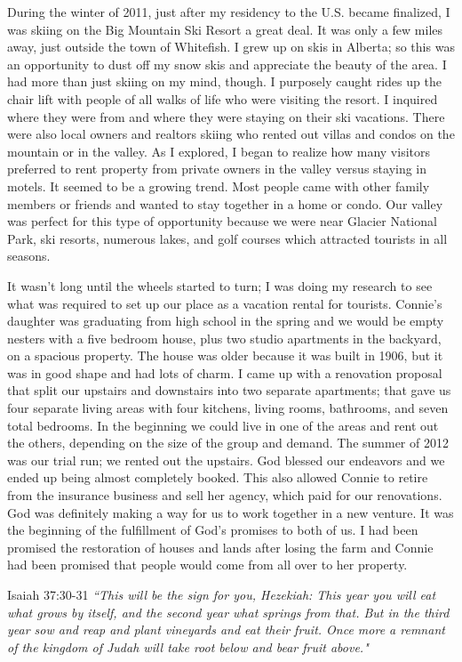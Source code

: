 \documentclass[oneside]{book}
\begin{document}
During the winter of 2011, just after my residency to the U.S. became finalized, I was skiing on the Big Mountain Ski Resort a great deal. It was only a few miles away, just outside the town of Whitefish. I grew up on skis in Alberta; so this was an opportunity to dust off my snow skis and appreciate the beauty of the area. I had more than just skiing on my mind, though. I purposely caught rides up the chair lift with people of all walks of life who were visiting the resort. I inquired where they were from and where they were staying on their ski vacations. There were also local owners and realtors skiing who rented out villas and condos on the mountain or in the valley. As I explored, I began to realize how many visitors preferred to rent property from private owners in the valley versus staying in motels. It seemed to be a growing trend. Most people came with other family members or friends and wanted to stay together in a home or condo. Our valley was perfect for this type of opportunity because we were near Glacier National Park, ski resorts, numerous lakes, and golf courses which attracted tourists in all seasons.

It wasn't long until the wheels started to turn; I was doing my research to see what was required to set up our place as a vacation rental for tourists. Connie's daughter was graduating from high school in the spring and we would be empty nesters with a five bedroom house, plus two studio apartments in the backyard, on a spacious property. The house was older because it was built in 1906, but it was in good shape and had lots of charm. I came up with a renovation proposal that split our upstairs and downstairs into two separate apartments; that gave us four separate living areas with four kitchens, living rooms, bathrooms, and seven total bedrooms. In the beginning we could live in one of the areas and rent out the others, depending on the size of the group and demand. The summer of 2012 was our trial run; we rented out the upstairs. God blessed our endeavors and we ended up being almost completely booked. This also allowed Connie to retire from the insurance business and sell her agency, which paid for our renovations. God was definitely making a way for us to work together in a new venture. It was the beginning of the fulfillment of God's promises to both of us. I had been promised the restoration of houses and lands after losing the farm and Connie had been promised that people would come from all over to her property. 

Isaiah 37:30-31 \textit{``This will be the sign for you, Hezekiah: This year you will eat what grows by itself, and the second year what springs from that. But in the third year sow and reap and plant vineyards and eat their fruit. Once more a remnant of the kingdom of Judah will take root below and bear fruit above."}
\end{document}
